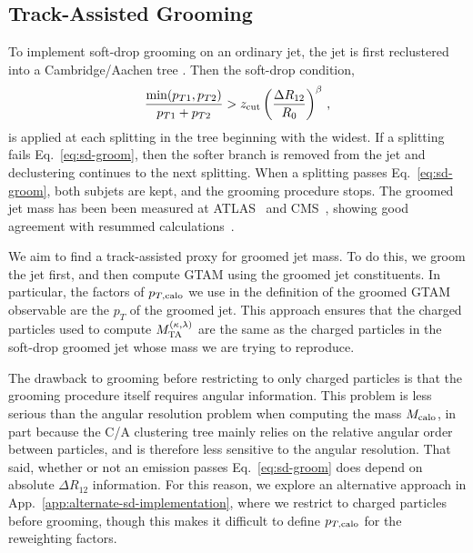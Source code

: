 \documentclass[letterpaper,11pt]{article}
\newcommand{\App}[1]{App.~\ref{#1}}
\newcommand{\Eq}[1]{Eq.~\eqref{#1}}
\begin{document}
\subsection{Track-Assisted Grooming}
\label{sec:ta_grooming}

To implement soft-drop grooming on an ordinary jet, the jet is first reclustered into a Cambridge/Aachen tree \cite{Dokshitzer:1997in,Wobisch:1998wt}.
%
Then the soft-drop condition,
\begin{equation}
\label{eq:sd-groom}
\frac{\min(p_{T1},p_{T2})}{p_{T1}+p_{T2}} > z_{\rm cut} \left(\frac{\Delta R_{12}}{R_0}\right)^\beta\,,
\end{equation}
is applied at each splitting in the tree beginning with the widest. 
%
If a splitting fails \Eq{eq:sd-groom}, then the softer branch is removed from the jet and declustering continues to the next splitting. 
%
When a splitting passes \Eq{eq:sd-groom}, both subjets are kept, and the grooming procedure stops.
%
The groomed jet mass has been been measured at ATLAS~\cite{Aaboud:2017qwh} and CMS~\cite{CMS:2017tdn}, showing good agreement with resummed calculations~\cite{Frye:2016okc,Frye:2016aiz, Marzani:2017mva,Marzani:2017kqd}. 

We aim to find a track-assisted proxy for groomed jet mass. 
%
To do this, we groom the jet first, and then compute GTAM using the groomed jet constituents. 
%
In particular, the factors of $p_{T,\rm calo}$ we use in the definition of the groomed GTAM observable are the $p_T$ of the groomed jet. 
%
This approach ensures that the charged particles used to compute $M_{\rm TA}^{(\kappa,\lambda)}$ are the same as the charged particles in the soft-drop groomed jet whose mass we are trying to reproduce.

The drawback to grooming before restricting to only charged particles is that the grooming procedure itself requires angular information. 
%
This problem is less serious than the angular resolution problem when computing the mass $M_{\rm calo}$, in part because the C/A clustering tree mainly relies on the relative angular order between particles, and is therefore less sensitive to the angular resolution.
%
That said, whether or not an emission passes \Eq{eq:sd-groom} does depend on absolute $\Delta R_{12}$ information.
%
For this reason, we explore an alternative approach in \App{app:alternate-sd-implementation}, where we restrict to charged particles before grooming, though this makes it difficult to define $p_{T,\rm calo}$ for the reweighting factors.
\end{document}
